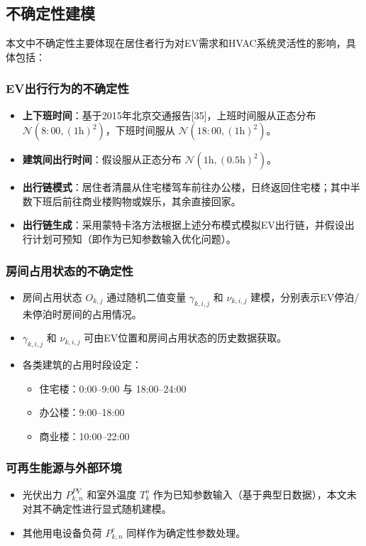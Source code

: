 \documentclass[11pt]{ctexart}
\begin{document}
\subsection{不确定性建模}

本文中不确定性主要体现在居住者行为对EV需求和HVAC系统灵活性的影响，具体包括：

\subsubsection{EV出行行为的不确定性}
\begin{itemize}[leftmargin=2em]
    \item \textbf{上下班时间}：基于2015年北京交通报告[35]，上班时间服从正态分布 $\mathcal{N}(8{:}00, (1\text{h})^2)$，下班时间服从 $\mathcal{N}(18{:}00, (1\text{h})^2)$。
    \item \textbf{建筑间出行时间}：假设服从正态分布 $\mathcal{N}(1\text{h}, (0.5\text{h})^2)$。
    \item \textbf{出行链模式}：居住者清晨从住宅楼驾车前往办公楼，日终返回住宅楼；其中半数下班后前往商业楼购物或娱乐，其余直接回家。
    \item \textbf{出行链生成}：采用蒙特卡洛方法根据上述分布模式模拟EV出行链，并假设出行计划可预知（即作为已知参数输入优化问题）。
\end{itemize}

\subsubsection{房间占用状态的不确定性}
\begin{itemize}[leftmargin=2em]
    \item 房间占用状态 $O_{k,j}$ 通过随机二值变量 $\gamma_{k,i,j}$ 和 $\nu_{k,i,j}$ 建模，分别表示EV停泊/未停泊时房间的占用情况。
    \item $\gamma_{k,i,j}$ 和 $\nu_{k,i,j}$ 可由EV位置和房间占用状态的历史数据获取。
    \item 各类建筑的占用时段设定：
    \begin{itemize}
        \item 住宅楼：0:00--9:00 与 18:00--24:00
        \item 办公楼：9:00--18:00
        \item 商业楼：10:00--22:00
    \end{itemize}
\end{itemize}

\subsubsection{可再生能源与外部环境}
\begin{itemize}[leftmargin=2em]
    \item 光伏出力 $P_{k,n}^{PV}$ 和室外温度 $T_k^o$ 作为已知参数输入（基于典型日数据），本文未对其不确定性进行显式随机建模。
    \item 其他用电设备负荷 $P_{k,n}^e$ 同样作为确定性参数处理。
\end{itemize}
\end{document}
